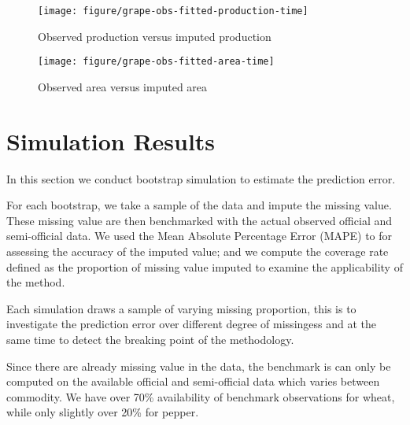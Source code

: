 \documentclass[nojss]{jss}\usepackage[]{graphicx}\usepackage[]{color}
\makeatletter
\def\maxwidth{ %
  \ifdim\Gin@nat@width>\linewidth
    \linewidth
  \else
    \Gin@nat@width
  \fi
}
\newenvironment{knitrout}{}{} %
\makeatother
\begin{document}
\begin{knitrout}
\color{fgcolor}\begin{figure}[!ht]


{\centering \texttt{[image: figure/grape-obs-fitted-production-time]} 

}

\caption[Observed production versus imputed production]{Observed production versus imputed production\label{fig:grape-obs-fitted-production-time}}
\end{figure}


\end{knitrout}


\begin{knitrout}
\color{fgcolor}\begin{figure}[!ht]


{\centering \texttt{[image: figure/grape-obs-fitted-area-time]} 

}

\caption[Observed area versus imputed area]{Observed area versus imputed area\label{fig:grape-obs-fitted-area-time}}
\end{figure}


\end{knitrout}


\FloatBarrier
\section{Simulation Results}
In this section we conduct bootstrap simulation to estimate the
prediction error.

For each bootstrap, we take a sample of the data and impute the
missing value. These missing value are then benchmarked with the
actual observed official and semi-official data. We used the Mean
Absolute Percentage Error (MAPE) to for assessing the accuracy of the
imputed value; and we compute the coverage rate defined as the
proportion of missing value imputed to examine the applicability of
the method.

Each simulation draws a sample of varying missing proportion, this is
to investigate the prediction error over different degree of
missingess and at the same time to detect the breaking point of the
methodology.

Since there are already missing value in the data, the benchmark is
can only be computed on the available official and semi-official data
which varies between commodity. We have over 70\% availability of
benchmark observations for wheat, while only slightly over 20\% for
pepper.
\end{document}
